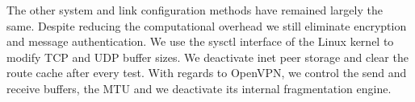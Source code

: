 The other system and link configuration methods have remained largely the
same. Despite reducing the computational overhead we still eliminate
encryption and message authentication. We use the sysctl interface of the
Linux kernel to modify TCP and UDP buffer sizes. We deactivate inet peer
storage and clear the route cache after every test. With regards to OpenVPN,
we control the send and receive buffers, the MTU and we deactivate its
internal fragmentation engine.
